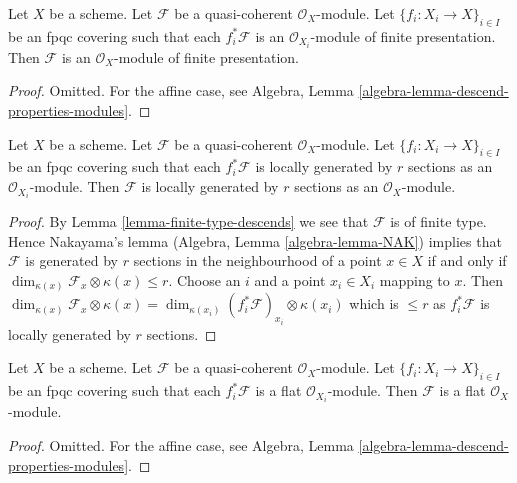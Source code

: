 \begin{lemma}
\label{lemma-finite-presentation-descends}
Let $X$ be a scheme.
Let $\mathcal{F}$ be a quasi-coherent $\mathcal{O}_X$-module.
Let $\{f_i : X_i \to X\}_{i \in I}$ be an fpqc covering such that
each $f_i^*\mathcal{F}$ is an $\mathcal{O}_{X_i}$-module of finite
presentation. Then $\mathcal{F}$ is an $\mathcal{O}_X$-module
of finite presentation.
\end{lemma}

\begin{proof}
Omitted. For the affine case, see
Algebra, Lemma \ref{algebra-lemma-descend-properties-modules}.
\end{proof}

\begin{lemma}
\label{lemma-locally-generated-by-r-sections-descends}
Let $X$ be a scheme.
Let $\mathcal{F}$ be a quasi-coherent $\mathcal{O}_X$-module.
Let $\{f_i : X_i \to X\}_{i \in I}$ be an fpqc covering such that
each $f_i^*\mathcal{F}$ is locally generated by $r$ sections as an
$\mathcal{O}_{X_i}$-module. Then $\mathcal{F}$ is locally generated by
$r$ sections as an $\mathcal{O}_X$-module.
\end{lemma}

\begin{proof}
By Lemma \ref{lemma-finite-type-descends} we see that $\mathcal{F}$
is of finite type. Hence Nakayama's lemma
(Algebra, Lemma \ref{algebra-lemma-NAK}) implies that $\mathcal{F}$
is generated by $r$ sections in the neighbourhood of a point $x \in X$
if and only if $\dim_{\kappa(x)} \mathcal{F}_x \otimes \kappa(x) \leq r$.
Choose an $i$ and a point $x_i \in X_i$ mapping to $x$. Then
$\dim_{\kappa(x)} \mathcal{F}_x \otimes \kappa(x) = 
\dim_{\kappa(x_i)} (f_i^*\mathcal{F})_{x_i} \otimes \kappa(x_i)$
which is $\leq r$ as $f_i^*\mathcal{F}$ is locally generated by $r$
sections.
\end{proof}

\begin{lemma}
\label{lemma-flat-descends}
Let $X$ be a scheme.
Let $\mathcal{F}$ be a quasi-coherent $\mathcal{O}_X$-module.
Let $\{f_i : X_i \to X\}_{i \in I}$ be an fpqc covering such that
each $f_i^*\mathcal{F}$ is a flat $\mathcal{O}_{X_i}$-module.
Then $\mathcal{F}$ is a flat $\mathcal{O}_X$-module.
\end{lemma}

\begin{proof}
Omitted. For the affine case, see
Algebra, Lemma \ref{algebra-lemma-descend-properties-modules}.
\end{proof}

